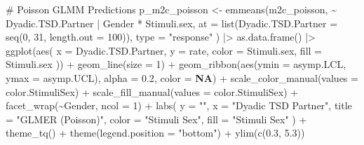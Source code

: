 \documentclass[
  bookmarksnumbered]{article}
\newenvironment{Shaded}{\begin{snugshade}}{\end{snugshade}}
\newcommand{\AttributeTok}[1]{\textcolor[rgb]{0.80,0.80,0.80}{#1}}
\newcommand{\CommentTok}[1]{\textcolor[rgb]{0.50,0.62,0.50}{#1}}
\newcommand{\ConstantTok}[1]{\textcolor[rgb]{0.86,0.64,0.64}{\textbf{#1}}}
\newcommand{\DecValTok}[1]{\textcolor[rgb]{0.86,0.86,0.80}{#1}}
\newcommand{\FloatTok}[1]{\textcolor[rgb]{0.75,0.75,0.82}{#1}}
\newcommand{\FunctionTok}[1]{\textcolor[rgb]{0.94,0.94,0.56}{#1}}
\newcommand{\NormalTok}[1]{\textcolor[rgb]{0.80,0.80,0.80}{#1}}
\newcommand{\OtherTok}[1]{\textcolor[rgb]{0.94,0.94,0.56}{#1}}
\newcommand{\SpecialCharTok}[1]{\textcolor[rgb]{0.86,0.64,0.64}{#1}}
\newcommand{\StringTok}[1]{\textcolor[rgb]{0.80,0.58,0.58}{#1}}
\begin{document}
\begin{Shaded}
\begin{Highlighting}[]
\CommentTok{\# Poisson GLMM Predictions}
\NormalTok{p\_m2c\_poisson }\OtherTok{\textless{}{-}} \FunctionTok{emmeans}\NormalTok{(m2c\_poisson, }\SpecialCharTok{\textasciitilde{}}\NormalTok{ Dyadic.TSD.Partner }\SpecialCharTok{|}\NormalTok{ Gender }\SpecialCharTok{*}\NormalTok{ Stimuli.sex,}
  \AttributeTok{at =} \FunctionTok{list}\NormalTok{(}\AttributeTok{Dyadic.TSD.Partner =} \FunctionTok{seq}\NormalTok{(}\DecValTok{0}\NormalTok{, }\DecValTok{31}\NormalTok{, }\AttributeTok{length.out =} \DecValTok{100}\NormalTok{)),}
  \AttributeTok{type =} \StringTok{"response"}
\NormalTok{) }\SpecialCharTok{|\textgreater{}}
  \FunctionTok{as.data.frame}\NormalTok{() }\SpecialCharTok{|\textgreater{}}
  \FunctionTok{ggplot}\NormalTok{(}\FunctionTok{aes}\NormalTok{(}
    \AttributeTok{x =}\NormalTok{ Dyadic.TSD.Partner, }\AttributeTok{y =}\NormalTok{ rate,}
    \AttributeTok{color =}\NormalTok{ Stimuli.sex, }\AttributeTok{fill =}\NormalTok{ Stimuli.sex}
\NormalTok{  )) }\SpecialCharTok{+}
  \FunctionTok{geom\_line}\NormalTok{(}\AttributeTok{size =} \DecValTok{1}\NormalTok{) }\SpecialCharTok{+}
  \FunctionTok{geom\_ribbon}\NormalTok{(}\FunctionTok{aes}\NormalTok{(}\AttributeTok{ymin =}\NormalTok{ asymp.LCL, }\AttributeTok{ymax =}\NormalTok{ asymp.UCL), }\AttributeTok{alpha =} \FloatTok{0.2}\NormalTok{, }\AttributeTok{color =} \ConstantTok{NA}\NormalTok{) }\SpecialCharTok{+}
  \FunctionTok{scale\_color\_manual}\NormalTok{(}\AttributeTok{values =}\NormalTok{ color.StimuliSex) }\SpecialCharTok{+}
  \FunctionTok{scale\_fill\_manual}\NormalTok{(}\AttributeTok{values =}\NormalTok{ color.StimuliSex) }\SpecialCharTok{+}
  \FunctionTok{facet\_wrap}\NormalTok{(}\SpecialCharTok{\textasciitilde{}}\NormalTok{Gender, }\AttributeTok{ncol =} \DecValTok{1}\NormalTok{) }\SpecialCharTok{+}
  \FunctionTok{labs}\NormalTok{(}
    \AttributeTok{y =} \StringTok{""}\NormalTok{, }\AttributeTok{x =} \StringTok{"Dyadic TSD Partner"}\NormalTok{,}
    \AttributeTok{title =} \StringTok{"GLMER (Poisson)"}\NormalTok{,}
    \AttributeTok{color =} \StringTok{"Stimuli Sex"}\NormalTok{, }\AttributeTok{fill =} \StringTok{"Stimuli Sex"}
\NormalTok{  ) }\SpecialCharTok{+}
  \FunctionTok{theme\_tq}\NormalTok{() }\SpecialCharTok{+}
  \FunctionTok{theme}\NormalTok{(}\AttributeTok{legend.position =} \StringTok{"bottom"}\NormalTok{) }\SpecialCharTok{+}
  \FunctionTok{ylim}\NormalTok{(}\FunctionTok{c}\NormalTok{(}\FloatTok{0.3}\NormalTok{, }\FloatTok{5.3}\NormalTok{))}


\end{Highlighting}
\end{Shaded}
\end{document}
